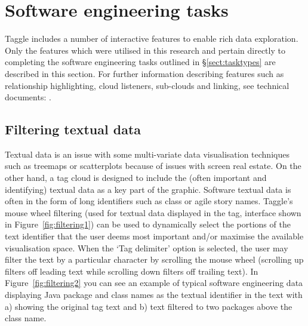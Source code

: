 

\section{Software engineering tasks}\label{sect:softwaretasks}

Taggle includes a number of interactive features to enable rich data exploration. Only the features which were utilised in this research and pertain directly to completing the software engineering tasks outlined in \S\ref{sect:tasktypes} are described in this section. For further information describing features such as relationship highlighting, cloud listeners, sub-clouds and linking, see technical documents: \citet{deaker11, deaker11c}.

\subsection{Filtering textual data}\label{sect:textualdata}

Textual data is an issue with some multi-variate data visualisation techniques such as treemaps or scatterplots because of issues with screen real estate. On the other hand, a tag cloud is designed to include the (often important and identifying) textual data as a key part of the graphic. Software textual data is often in the form of long identifiers such as class or agile story names. Taggle's mouse wheel filtering (used for textual data displayed in the tag, interface shown in Figure~\vref{fig:filtering1}) can be used to dynamically select the portions of the text identifier that the user deems most important and/or maximise the available visualisation space. When the `Tag delimiter' option is selected, the user may filter the text by a particular character by scrolling the mouse wheel (scrolling up filters off leading text while scrolling down filters off trailing text). In Figure~\vref{fig:filtering2} you can see an example of typical software engineering data displaying Java package and class names as the textual identifier in the text with a) showing the original tag text and b) text filtered to two packages above the class name.

